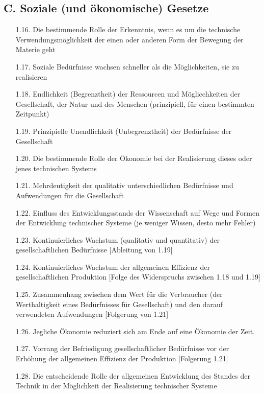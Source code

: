 \documentclass[11pt,a4paper]{article}
\begin{document}
\subsection*{C. Soziale (und ökonomische) Gesetze}
\begin{itemize}\itemsep0pt
\item[1.16.] Die bestimmende Rolle der Erkenntnis, wenn es um die technische
  Verwendungsmöglich\-keit der einen oder anderen Form der Bewegung der
  Materie geht
\item[1.17.] Soziale Bedürfnisse wachsen schneller als die Möglichkeiten, sie
  zu realisieren
\item[1.18.] Endlichkeit (Begrenztheit) der Ressourcen und Möglicchkeiten der
  Gesellschaft, der Natur und des Menschen (prinzipiell, für einen bestimmten
  Zeitpunkt)
\item[1.19.] Prinzipielle Unendlichkeit (Unbegrenztheit) der Bedürfnisse der
  Gesellschaft
\item[1.20.] Die bestimmende Rolle der Ökonomie bei der Realisierung dieses
  oder jenes technischen Systems
\item[1.21.] Mehrdeutigkeit der qualitativ unterschiedlichen Bedürfnisse und
  Aufwendungen für die Gesellschaft
\item[1.22.] Einfluss des Entwicklungsstands der Wissenschaft auf Wege und
  Formen der Entwicklung technischer Systeme (je weniger Wissen, desto mehr
  Fehler)
\item[1.23.] Kontinuierliches Wachstum (qualitativ und quantitativ) der
  gesellschaftlichen Bedürf\-nisse [Ableitung von 1.19]
\item[1.24.] Kontinuierliches Wachstum der allgemeinen Effizienz der
  gesellschaftlichen Produktion [Folge des Widerspruchs zwischen 1.18 und
    1.19]
\item[1.25.] Zusammenhang zwischen dem Wert für die Verbraucher (der
  Werthaltigkeit eines Be\-dürfnisses für Gesellschaft) und den darauf
  verwendeten Aufwendungen [Folgerung von 1.21]
\item[1.26.] Jegliche Ökonomie reduziert sich am Ende auf eine Ökonomie der
  Zeit.
\item[1.27.] Vorrang der Befriedigung gesellschaftlicher Bedürfnisse vor der
  Erhöhung der allgemeinen Effizienz der Produktion [Folgerung 1.21]
\item[1.28.] Die entscheidende Rolle der allgemeinen Entwicklung des Standes
  der Technik in der Möglichkeit der Realisierung technischer Systeme
\end{itemize}
\end{document}
